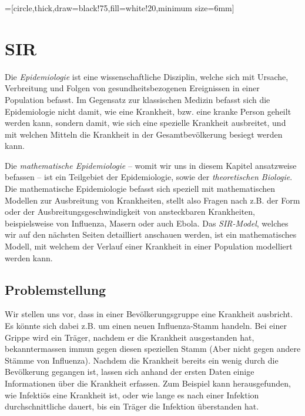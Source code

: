 \usetikzlibrary{arrows,shapes,snakes,automata,backgrounds,petri}
=[circle,thick,draw=black!75,fill=white!20,minimum size=6mm]

\chapter{SIR\label{chapter:sir}}
\begin{refsection}

Die \emph{Epidemiologie} ist eine wissenschaftliche Disziplin, welche sich mit Ursache, Verbreitung und Folgen von gesundheitsbezogenen Ereignissen in einer Population befasst.
Im Gegensatz zur klassischen Medizin befasst sich die Epidemiologie nicht damit, wie eine Krankheit, bzw. eine kranke Person geheilt werden kann, sondern damit, wie sich eine spezielle Krankheit ausbreitet, und mit welchen Mitteln die Krankheit in der Gesamtbevölkerung besiegt werden kann.

Die \emph{mathematische Epidemiologie} -- womit wir uns in diesem Kapitel ansatzweise befassen -- ist ein Teilgebiet der Epidemiologie, sowie der \emph{theoretischen Biologie}.
Die mathematische Epidemiologie befasst sich speziell mit mathematischen Modellen zur Ausbreitung von Krankheiten, stellt also Fragen nach z.B. der Form oder der Ausbreitungsgeschwindigkeit von ansteckbaren Krankheiten, beispielsweise von Influenza, Masern oder auch Ebola. 
Das \emph{SIR-Model}, welches wir auf den nächsten Seiten detailliert anschauen werden, ist ein mathematisches Modell, mit welchem der Verlauf einer Krankheit in einer Population modelliert werden kann.

\section{Problemstellung}
Wir stellen uns vor, dass in einer Bevölkerungsgruppe eine Krankheit ausbricht. 
Es könnte sich dabei z.B. um einen neuen Influenza-Stamm handeln.
Bei einer Grippe wird ein Träger, nachdem er die Krankheit ausgestanden hat, bekanntermassen immun gegen diesen speziellen Stamm (Aber nicht gegen andere Stämme von Influenza).
Nachdem die Krankheit bereits ein wenig durch die Bevölkerung gegangen ist, lassen sich anhand der ersten Daten einige Informationen über die Krankheit erfassen.
Zum Beispiel kann herausgefunden, wie Infektiös eine Krankheit ist, oder wie lange es nach einer Infektion durchschnittliche dauert, bis ein Träger die Infektion überstanden hat.


\end{refsection}
